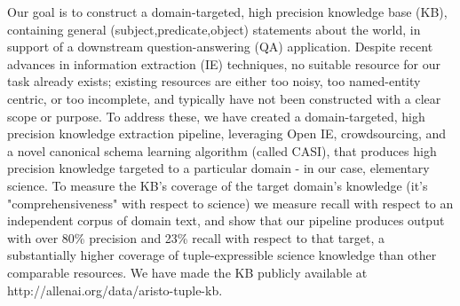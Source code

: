 Our goal is to construct a domain-targeted, high precision knowledge base (KB), containing general (subject,predicate,object) statements about the world, in support of a downstream question-answering (QA) application. Despite recent advances in information extraction (IE) techniques, no suitable resource for our task already exists; existing resources are either too noisy, too named-entity centric, or too incomplete, and typically have not been constructed with a clear scope or purpose. To address these, we have created a domain-targeted, high precision knowledge extraction pipeline, leveraging Open IE, crowdsourcing, and a novel canonical schema learning algorithm (called CASI), that produces high precision knowledge targeted to a particular domain - in our case, elementary science. To measure the KB’s coverage of the target domain’s knowledge (it’s "comprehensiveness" with respect to science) we measure recall with respect to an independent corpus of domain text, and show that our pipeline produces output with over 80\% precision and 23\% recall with respect to that target, a substantially higher coverage of tuple-expressible science knowledge than other comparable resources. We have made the KB publicly available at http://allenai.org/data/aristo-tuple-kb.